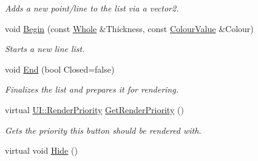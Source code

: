 \begin{DoxyCompactItemize}
\begin{DoxyCompactList}\small\item\em Adds a new point/line to the list via a vector2. \item\end{DoxyCompactList}\item 
void \hyperlink{classMezzanine_1_1UI_1_1LineList_a0903825b873157e6733c20ad8da3e563}{Begin} (const \hyperlink{namespaceMezzanine_adcbb6ce6d1eb4379d109e51171e2e493}{Whole} \&Thickness, const \hyperlink{classMezzanine_1_1ColourValue}{ColourValue} \&Colour)
\begin{DoxyCompactList}\small\item\em Starts a new line list. \item\end{DoxyCompactList}\item 
void \hyperlink{classMezzanine_1_1UI_1_1LineList_aa216a1f529f4e8664ec2d6877f4c9cf5}{End} (bool Closed=false)
\begin{DoxyCompactList}\small\item\em Finalizes the list and prepares it for rendering. \item\end{DoxyCompactList}\item 
virtual \hyperlink{namespaceMezzanine_1_1UI_ac4c753eb6b5d66350a243acc9ce54130}{UI::RenderPriority} \hyperlink{classMezzanine_1_1UI_1_1LineList_aae3d6b141f56eb21a22a4c80dd60d419}{GetRenderPriority} ()
\begin{DoxyCompactList}\small\item\em Gets the priority this button should be rendered with. \item\end{DoxyCompactList}\item 
\hypertarget{classMezzanine_1_1UI_1_1LineList_aa48e17f637d9237ea9aa25294de87fe5}{
virtual void \hyperlink{classMezzanine_1_1UI_1_1LineList_aa48e17f637d9237ea9aa25294de87fe5}{Hide} ()}
\label{classMezzanine_1_1UI_1_1LineList_aa48e17f637d9237ea9aa25294de87fe5}


\end{DoxyCompactItemize}
